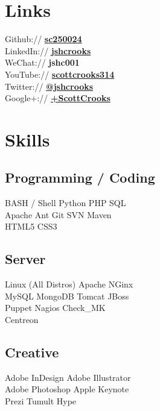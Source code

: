 \documentclass[a4paper]{deedy-resume-proximanova-sanfran} %
\begin{document}
\begin{minipage}[t]{0.33\textwidth}
\section{Links} 

Github:// \href{https://github.com/sc250024}{\bf sc250024} \\
LinkedIn:// \href{https://www.linkedin.com/in/jshcrooks}{\bf jshcrooks} \\
WeChat:// {\bf jshc001} \\
YouTube:// \href{https://www.youtube.com/user/scottcrooks314}{\bf scottcrooks314} \\
Twitter:// \href{https://twitter.com/jshcrooks}{\bf @jshcrooks} \\
Google+:// \href{https://www.google.com/+ScottCrooks}{\bf +ScottCrooks}

\sectionspace %


\section{Skills}

\subsection{Programming / Coding}

BASH / Shell \textbullet{} Python \textbullet{} PHP \textbullet{} SQL \\
Apache Ant \textbullet{} Git \textbullet{} SVN \textbullet{} Maven \\
HTML5 \textbullet{} CSS3

\sectionspace %

\subsection{Server}
Linux (All Distros) \textbullet{} Apache \textbullet{} NGinx \\
MySQL \textbullet{} MongoDB \textbullet{} Tomcat \textbullet{} JBoss \\
Puppet \textbullet{} Nagios \textbullet{} Check\_MK \\ 
Centreon \\

\sectionspace %

\subsection{Creative}
Adobe InDesign \textbullet{} Adobe Illustrator \\
Adobe Photoshop \textbullet{} Apple Keynote \\ 
Prezi \textbullet{} Tumult Hype


\end{minipage}
\end{document}
